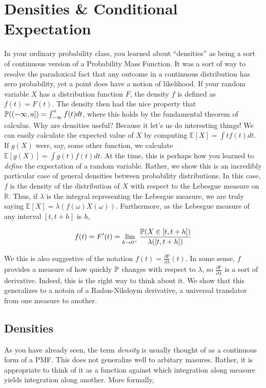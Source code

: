 \chapter{Densities \& Conditional Expectation}

In your ordinary probability class, you learned about 
``densities'' as being a sort of continuous version of a Probability 
Mass Function. It was a sort of way to resolve the paradoxical fact that 
any outcome in a continuous distribution has zero probability, yet a point 
does have a notion of likelihood. If your random variable $X$ has a distribution 
function $F$, the density $f$ is defined as $f(t) = F(t)$. The density then had 
the nice property that $\mathbb P((-\infty, a]) = \int_{-\infty}^a f(t)dt$, where this holds by 
the fundamental theorem of calculus. Why are densities useful? Because it let's us do 
interesting things! We can easily calculate the expected value of $X$ by computing 
$\mathbb E[X] = \int tf(t)dt$. If $g(X)$ were, say, some other function, we calculate 
$\mathbb E[g(X)] = \int g(t)f(t)dt$. At the time, this is perhaps how you learned 
to \emph{define} the expectation of a random variable. Rather, we show this is an 
incredibly particular case of general densities between probability distributions. In this case, 
$f$ is the density of the distribution of $X$ with respect to the Lebesgue measure on 
$\mathbb R$. Thus, if $\lambda$ is the integral representing the Lebesgue measure, we are truly 
saying $\mathbb E[X] = \lambda(f(\omega)X(\omega))$. Furthermore, as the Lebesgue measure of 
any interval $[t,t+h]$ is $h$,

\[ f(t) = F'(t) = \lim_{h \to 0^+} \frac{\mathbb P(X \in [t, t+h])}{\lambda([t,t+h])}  \]

We this is also suggestive of the notation $f(t) = \frac{\partial \mathbb P}{\partial \lambda}(t)$. In some sense, 
$f$ provides a measure of how quickly $\mathbb P$ changes with respect to $\lambda$, so $\frac{\partial \mathbb P}{\partial \lambda}$ is 
a sort of derivative. Indeed, this is the right way to think about it. We show that this generalizes to a notoin of a 
Radon-Nikdoym derivative, a universal translator from one measure to another. 

\section{Densities}

As you have already seen, the term \emph{density} is usually thought of as a continuous form of a 
PMF. This does not generalize well to arbitary masures. Rather, it is appropriate to think of it as a 
function against which integration along measure yields integration along another. More formally, 

